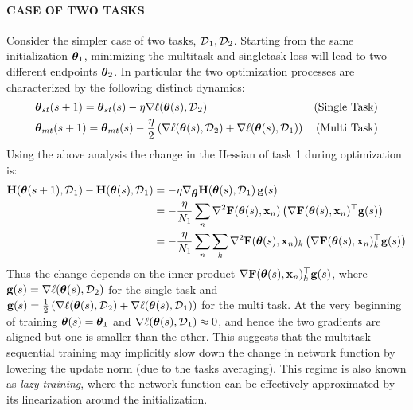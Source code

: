 \documentclass{article} %
\newcommand{\hessian}{\vH}
\begin{document}
\paragraph{CASE OF TWO TASKS} Consider the simpler case of two tasks, $\mbox{${\cal D}$}_1, \mbox{${\cal D}$}_2$. Starting from the same initialization $\mbox{$\mbox{$\boldsymbol{\theta}$}$}_1$, minimizing the multitask and singletask loss will lead to two different endpoints $\mbox{$\mbox{$\boldsymbol{\theta}$}$}_2$. In particular the two optimization processes are characterized by the following distinct dynamics: 
\begin{align}
    &\mbox{$\mbox{$\boldsymbol{\theta}$}$}_{st}(s+1) = \mbox{$\mbox{$\boldsymbol{\theta}$}$}_{st}(s) - \eta\nabla\ell(\mbox{$\mbox{$\boldsymbol{\theta}$}$}(s), \mbox{${\cal D}$}_2) &\text{(Single Task)}\\
    &\mbox{$\mbox{$\boldsymbol{\theta}$}$}_{mt}(s+1) = \mbox{$\mbox{$\boldsymbol{\theta}$}$}_{mt}(s) - \frac{\eta}{2}\left(\nabla\ell(\mbox{$\mbox{$\boldsymbol{\theta}$}$}(s), \mbox{${\cal D}$}_2)+\nabla\ell(\mbox{$\mbox{$\boldsymbol{\theta}$}$}(s), \mbox{${\cal D}$}_1)\right) &\text{(Multi Task)}
\end{align}
Using the above analysis the change in the Hessian of task 1 during optimization is: 
\begin{align}
    \hessian(\vparam(s+1), \data_1) - \hessian(\vparam(s), \data_1) 
    &= - \eta \grad_{\vparam}{\hessian(\vparam(s), \data_1)} \, \vg(s)\\
    &= - \frac{\eta}{N_1} \sum_n \grad^2\vF(\vparam(s), \vx_n)\rnd{\grad\vF(\vparam(s), \vx_n)^\top\vg(s)} \\
    &= - \frac{\eta}{N_1} \sum_n \sum_k \grad^2\vF(\vparam(s), \vx_n)_k\rnd{\grad\vF(\vparam(s), \vx_n)_k^\top\vg(s)} 
\end{align}
Thus the change depends on the inner product $\nabla\mbox{$\mbox{$\mathbf{F}$}$}(\mbox{$\mbox{$\boldsymbol{\theta}$}$}(s), \mbox{$\mbox{$\mathbf{x}$}$}_n)_k^\top\mbox{$\mbox{$\mathbf{g}$}$}(s)$, where $\mbox{$\mbox{$\mathbf{g}$}$}(s) = \nabla\ell(\mbox{$\mbox{$\boldsymbol{\theta}$}$}(s), \mbox{${\cal D}$}_2)$ for the single task and $\mbox{$\mbox{$\mathbf{g}$}$}(s) = \frac{1}{2}\left(\nabla\ell(\mbox{$\mbox{$\boldsymbol{\theta}$}$}(s), \mbox{${\cal D}$}_2)+\nabla\ell(\mbox{$\mbox{$\boldsymbol{\theta}$}$}(s), \mbox{${\cal D}$}_1)\right)$ for the multi task. At the very beginning of training $\mbox{$\mbox{$\boldsymbol{\theta}$}$}(s) = \mbox{$\mbox{$\boldsymbol{\theta}$}$}_1$ and $\nabla\ell(\mbox{$\mbox{$\boldsymbol{\theta}$}$}(s), \mbox{${\cal D}$}_1)\approx 0$, and hence the two gradients are aligned but one is smaller than the other. This suggests that the multitask sequential training may implicitly slow down the change in network function by lowering the update norm (due to the tasks averaging). This regime is also known as \emph{lazy training}, where the network function can be effectively approximated by its linearization around the initialization. 
\end{document}
